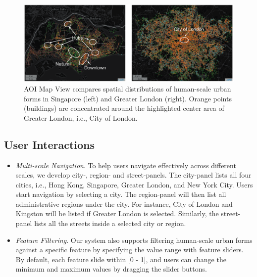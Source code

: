 \begin{figure}[t]
	\centering
	\includegraphics[width=0.95\columnwidth]{figure/streetvizor/fig8_study_1/study_1_spatial}
	\vspace{-4mm}
	\caption{
	AOI Map View compares spatial distributions of human-scale urban forms in Singapore (left) and Greater London (right).
	Orange points (buildings) are concentrated around the highlighted center area of Greater London, i.e., City of London.}
	\label{fig:c1_study_1_spatial}
\end{figure}




\subsection{User Interactions}
\label{ssec:c1_user_interaction}


\begin{itemize}

\item
\textit{Multi-scale Navigation}.
To help users navigate effectively across different scales, we develop city-, region- and street-panels.
The city-panel lists all four cities, i.e., Hong Kong, Singapore, Greater London, and New York City.
Users start navigation by selecting a city. 
The region-panel will then list all administrative regions under the city.
For instance, City of London and Kingston will be listed if Greater London is selected.
Similarly, the street-panel lists all the streets inside a selected city or region.

\item
\textit{Feature Filtering}.
Our system also supports filtering human-scale urban forms against a specific feature by specifying the value range with feature sliders. 
By default, each feature slide within [0 - 1], and users can change the minimum and maximum values by dragging the slider buttons.

\end{itemize}

